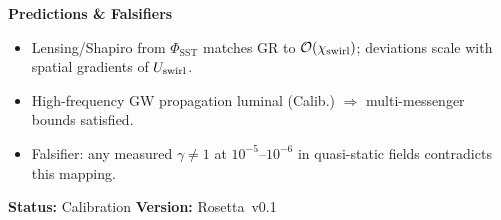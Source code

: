 \documentclass[11pt]{article}
\begin{document}
\begin{tcolorbox}[title=Rosetta Card: GR/PPN/GW $\to$ Swirl–String Theory (SST)]
    \textbf{Predictions \& Falsifiers}
    \begin{itemize}\itemsep2pt
    \item Lensing/Shapiro from $\Phi_{\text{SST}}$ matches GR to $\mathcal{O}(\chi_{\text{swirl}})$; deviations scale with spatial gradients of $U_{\text{swirl}}$.
    \item High-frequency GW propagation luminal (Calib.) $\Rightarrow$ multi-messenger bounds satisfied.
    \item Falsifier: any measured $\gamma\neq 1$ at $10^{-5}$–$10^{-6}$ in quasi-static fields contradicts this mapping.
    \end{itemize}

    \textbf{Status:} Calibration \hfill \textbf{Version:} Rosetta~v0.1
    \end{tcolorbox}
\end{document}
